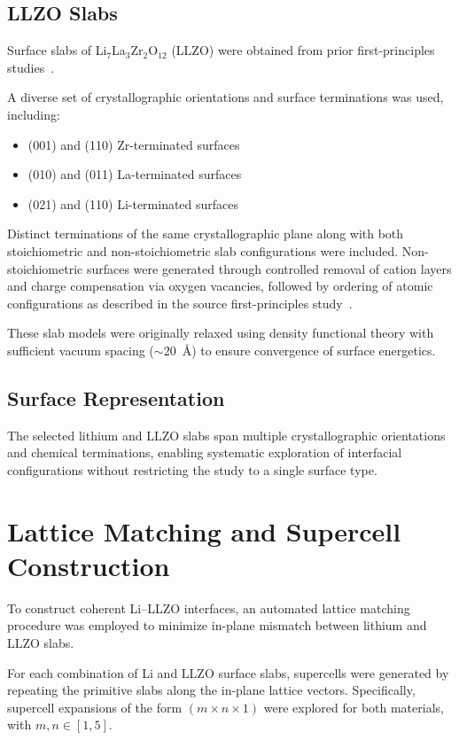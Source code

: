 \documentclass[12pt,a4paper,oneside]{book}
\begin{document}
\subsection{LLZO Slabs}

Surface slabs of Li$_7$La$_3$Zr$_2$O$_{12}$ (LLZO) were obtained from prior
first-principles studies~\cite{Canepa2018LLZO}.

A diverse set of crystallographic orientations and surface terminations was used, including:

\begin{itemize}
    \item (001) and (110) Zr-terminated surfaces
    \item (010) and (011) La-terminated surfaces
    \item (021) and (110) Li-terminated surfaces
\end{itemize}

Distinct terminations of the same crystallographic plane along with
both stoichiometric and non-stoichiometric slab configurations were included.
Non-stoichiometric surfaces were generated through controlled removal of cation
layers and charge compensation via oxygen vacancies, followed by ordering of atomic configurations as described in the source
first-principles study~\cite{Canepa2018LLZO}.

These slab models were originally relaxed using density functional theory with
sufficient vacuum spacing ($\sim$20~\AA) to ensure convergence of surface energetics.

\subsection{Surface Representation}

The selected lithium and LLZO slabs span multiple crystallographic orientations
and chemical terminations, enabling systematic exploration of interfacial configurations
without restricting the study to a single surface type.

\section{Lattice Matching and Supercell Construction}

To construct coherent Li--LLZO interfaces, an automated lattice matching procedure
was employed to minimize in-plane mismatch between lithium and LLZO slabs.

For each combination of Li and LLZO surface slabs, supercells were generated by
repeating the primitive slabs along the in-plane lattice vectors. Specifically,
supercell expansions of the form $(m \times n \times 1)$ were explored for both
materials, with $m,n \in [1,5]$.
\end{document}
